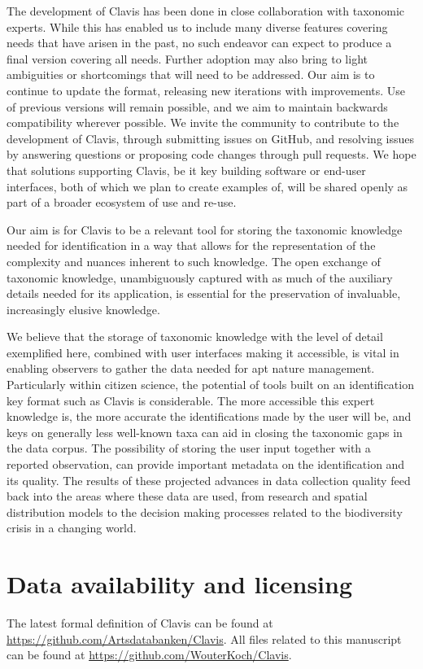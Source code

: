\documentclass[10pt,letterpaper]{article}
\begin{document}
The development of Clavis has been done in close collaboration with taxonomic experts. While this has enabled us to include many diverse features covering needs that have arisen in the past, no such endeavor can expect to produce a final version covering all needs. Further adoption may also bring to light ambiguities or shortcomings that will need to be addressed. Our aim is to continue to update the format, releasing new iterations with improvements. Use of previous versions will remain possible, and we aim to maintain backwards compatibility wherever possible. We invite the community to contribute to the development of Clavis, through submitting issues on GitHub, and resolving issues by answering questions or proposing code changes through pull requests. We hope that solutions supporting Clavis, be it key building software or end-user interfaces, both of which we plan to create examples of, will be shared openly as part of a broader ecosystem of use and re-use.

Our aim is for Clavis to be a relevant tool for storing the taxonomic knowledge needed for identification in a way that allows for the representation of the complexity and nuances inherent to such knowledge. The open exchange of taxonomic knowledge, unambiguously captured with as much of the auxiliary details needed for its application, is essential for the preservation of invaluable, increasingly elusive knowledge.

We believe that the storage of taxonomic knowledge with the level of detail exemplified here, combined with user interfaces making it accessible, is vital in enabling observers to gather the data needed for apt nature management. Particularly within citizen science, the potential of tools built on an identification key format such as Clavis is considerable. The more accessible this expert knowledge is, the more accurate the identifications made by the user will be, and keys on generally less well-known taxa can aid in closing the taxonomic gaps in the data corpus. The possibility of storing the user input together with a reported observation, can provide important metadata on the identification and its quality. The results of these projected advances in data collection quality feed back into the areas where these data are used, from research and spatial distribution models to the decision making processes related to the biodiversity crisis in a changing world.

\section*{
Data availability and licensing
}
The latest formal definition of Clavis can be found at \url{https://github.com/Artsdatabanken/Clavis}. All files related to this manuscript can be found at \url{https://github.com/WouterKoch/Clavis}.
\end{document}
